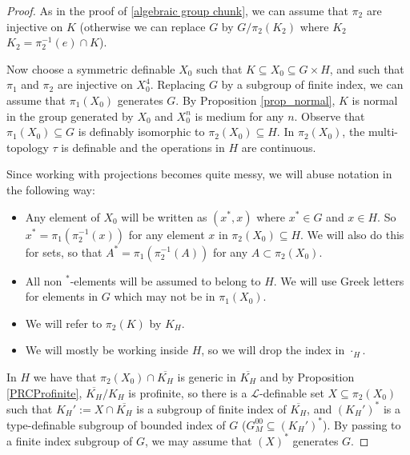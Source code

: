 \documentclass[12pt]{article}
\theoremstyle{definition}
\theoremstyle{mystyle}
\theoremstyle{remark}
\newcommand{\LC}{\mathcal{L}}
\begin{document}
\begin{proof}
\begin{comment}
\bigskip
\end{comment}

As in the proof of \ref{algebraic group chunk}, we can assume that $\pi_2$ are injective on $K$ (otherwise
we can replace $G$ by $G/\pi_2(K_2)$ where $K_2$ $K_2 = \pi_2^{-1}(e)\cap K$).


Now choose a symmetric definable $X_0$ such that $K \subseteq X_0
\subseteq G\times H$, and  such that $\pi_1$ and $\pi_2$ are
injective on $X_0^4$. Replacing $G$ by a subgroup of finite index,
we can assume that $\pi_1(X_0)$ generates $G$. By Proposition \ref{prop_normal}, $K$ is normal in the group
generated by $X_0$ and $X_0^n$ is medium for any $n$. Observe
that $\pi_1(X_0)\subseteq G$ is definably isomorphic to
$\pi_2(X_0)\subseteq H$.
In $\pi_2(X_0)$, the multi-topology $\tau$ is definable and the operations in $H$ are continuous.


Since working with projections becomes quite messy, we will abuse notation in the following way:

\begin{itemize}
\item Any element of $X_0$ will be written as $(x^*, x)$ where
$x^*\in G$ and $x\in H$. So $x^*=\pi_1(\pi_2^{-1}(x))$ for any
element $x$ in $\pi_2(X_0)\subseteq H$. We will also do this for
sets, so that $A^*=\pi_1(\pi_2^{-1}(A))$ for any $A\subset
\pi_2(X_0)$.

\item All non $^*$-elements will be assumed to belong to $H$. We
will use Greek letters for elements in $G$ which may not be in
$\pi_1(X_0)$.

\item We will refer to $\pi_2(K)$ by $K_H$.

\item We will mostly be working inside $H$, so we will drop the
index in $\cdot_H$.

\end{itemize}

\bigskip

In $H$ we have that $\pi_2(X_0) \cap \overline{K_H}$ is generic in
$\overline{K_H}$ and by Proposition \ref{PRCProfinite},
$\overline{K_H}/K_H$ is profinite, so there is a $\LC$-definable
set $X \subseteq \pi_2(X_0)$  such that $K_H':= X \cap
\overline{K_H}$ is a subgroup of finite index  of
$\overline{K_H}$, and $(K_H')^*$ is a type-definable subgroup of
bounded index of $G$ ($G^{00}_M \subseteq (K_H')^*$). By passing
to a finite index subgroup of $G$, we may assume that $(X)^*$
generates $G$.


\end{proof}
\end{document}
